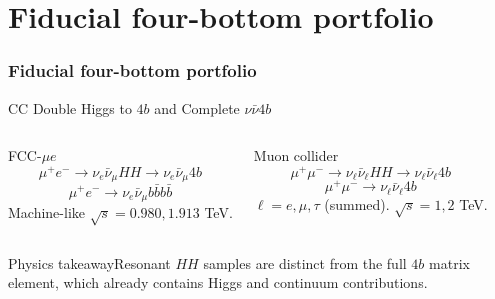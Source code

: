 \documentclass[aspectratio=1610,english]{beamer}
\newcommand{\src}[1]{\vfill{\par\color{black!65}\fontsize{6.4}{7.4}\selectfont\emph{Source:} #1\par}}
\newcommand{\key}[1]{\begin{alertblock}{Physics takeaway}\small  #1\end{alertblock}}
\begin{document}
\part{Fiducial four-bottom portfolio}
\section{Fiducial four-bottom portfolio}







\begin{frame}[t]{CC Double Higgs to $4b$ and Complete $\nu\bar\nu4b$}
\small

\begin{columns}%
\begin{block}{FCC-$\mu e$}
\[\mu^+e^-\to\nu_e\bar\nu_\mu HH\to\nu_e\bar\nu_\mu4b\]
\[\mu^+e^-\to\nu_e\bar\nu_\mu b\bar bb\bar b\]
Machine-like $\sqrt{s}=0.980,1.913$ TeV.
\end{block}
\begin{block}{Muon collider}
\[\mu^+\mu^-\to\nu_\ell\bar\nu_\ell HH\to\nu_\ell\bar\nu_\ell4b\]
\[\mu^+\mu^-\to\nu_\ell\bar\nu_\ell4b\]
$\ell=e,\mu,\tau$ (summed). $\sqrt{s}=1,2$ TeV.
\end{block}
\end{columns}
\key{Resonant $HH$ samples are distinct from the full $4b$ matrix element, which already contains Higgs and continuum contributions.}

\end{frame}
\end{document}
